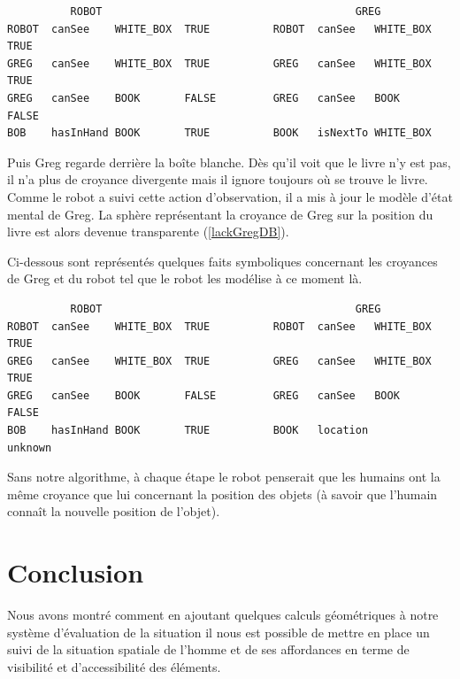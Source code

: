 \documentclass[a4paper,11pt,twoside]{StyleThese}
\begin{document}
\begin{scriptsize}
\begin{verbatim}
          ROBOT                                        GREG
ROBOT  canSee    WHITE_BOX  TRUE          ROBOT  canSee   WHITE_BOX   TRUE    
GREG   canSee    WHITE_BOX  TRUE          GREG   canSee   WHITE_BOX   TRUE
GREG   canSee    BOOK       FALSE         GREG   canSee   BOOK        FALSE
BOB    hasInHand BOOK       TRUE          BOOK   isNextTo WHITE_BOX
\end{verbatim}
\end{scriptsize}

Puis Greg regarde derrière la boîte blanche. Dès qu'il voit que le livre n'y est pas, il n'a plus de croyance divergente mais il ignore toujours où se trouve le livre. Comme le robot a suivi cette action d'observation, il a mis à jour le modèle d'état mental de Greg. La sphère représentant la croyance de Greg sur la position du livre est alors devenue transparente (\ref{lackGregDB}).

Ci-dessous sont représentés quelques faits symboliques concernant les croyances de Greg et du robot tel que le robot les modélise à ce moment là.

\begin{scriptsize}
\begin{verbatim}
          ROBOT                                        GREG
ROBOT  canSee    WHITE_BOX  TRUE          ROBOT  canSee   WHITE_BOX   TRUE    
GREG   canSee    WHITE_BOX  TRUE          GREG   canSee   WHITE_BOX   TRUE
GREG   canSee    BOOK       FALSE         GREG   canSee   BOOK        FALSE
BOB    hasInHand BOOK       TRUE          BOOK   location             unknown
\end{verbatim}
\end{scriptsize}


Sans notre algorithme, à chaque étape le robot penserait que les humains ont la même croyance que lui concernant la position des objets (à savoir que l'humain connaît la nouvelle position de l'objet).


\section{Conclusion}
Nous avons montré comment en ajoutant quelques calculs géométriques à notre système d'évaluation de la situation il nous est possible de mettre en place un suivi de la situation spatiale de l'homme et de ses affordances en terme de visibilité et d'accessibilité des éléments.
\end{document}
